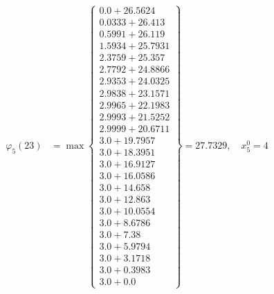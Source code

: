 \documentclass{article}
\begin{document}
\begin{align*}
  
  
  
\varphi_{5}(23) &= \max \left\{ \begin{array}{c}
0.0 + 26.5624 \\
 0.0333 + 26.413 \\
 0.5991 + 26.119 \\
 1.5934 + 25.7931 \\
 2.3759 + 25.357 \\
 2.7792 + 24.8866 \\
 2.9353 + 24.0325 \\
 2.9838 + 23.1571 \\
 2.9965 + 22.1983 \\
 2.9993 + 21.5252 \\
 2.9999 + 20.6711 \\
 3.0 + 19.7957 \\
 3.0 + 18.3951 \\
 3.0 + 16.9127 \\
 3.0 + 16.0586 \\
 3.0 + 14.658 \\
 3.0 + 12.863 \\
 3.0 + 10.0554 \\
 3.0 + 8.6786 \\
 3.0 + 7.38 \\
 3.0 + 5.9794 \\
 3.0 + 3.1718 \\
 3.0 + 0.3983 \\
 3.0 + 0.0
\end{array} \right\}=27.7329,\quad x_{5}^0=4\\
  
  
  

\end{align*}
\end{document}
